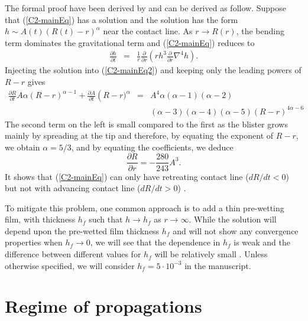 The formal proof  have been derived by  \citet{Flitton:1999iv} and can
be derived  as follow. Suppose  that (\ref{C2-mainEq}) has  a solution
and the solution has the  form $h \sim A(t)(R(t)-r)^{\alpha}$ near the
contact line.  As $r \rightarrow R(r)$, the bending term dominates the
gravitational term and (\ref{C2-mainEq}) reduces to
\begin{eqnarray}
  \frac{\partial       h}{\partial       t}&      =&\frac{1}{       r}
                                                     \frac{\partial}{\partial r}\left( rh^3 \frac{\partial}{\partial r}\nabla^4h\right).
                                                     \label{C2-mainEq2}
\end{eqnarray}
Injecting the  solution into  (\ref{C2-mainEq2}) and keeping  only the
leading powers of $R-r$ gives
\begin{eqnarray}
  \frac{\partial    R}{\partial    t}    A\alpha\left(R-r\right)^{\alpha-1}+
  \frac{\partial           A}{\partial           t}\left(R-r)^{\alpha}
  &=&A^4\alpha(\alpha-1)(\alpha-2)\nonumber\\
  &&(\alpha-3)(\alpha-4)(\alpha-5)(R-r)^{4\alpha-6}\nonumber
\end{eqnarray}
The second  term on  the left is  small compared to  the first  as the
blister  grows  mainly by  spreading  at  the  tip and  therefore,  by
equating  the exponent  of $R-r$,  we obtain  $\alpha =  5/3$, and  by
equating the coefficients, we deduce
\begin{equation}
  \frac{\partial R}{\partial r} =-\frac{280}{243} A^3.
\end{equation}
It shows that (\ref{C2-mainEq}) can  only have retreating contact line
($dR/dt<0$)   but  not   with  advancing   contact  line   ($dR/dt>0$)
\citep{Lister:2013ia,Flitton:1999iv}.

To  mitigate this  problem,  one  common approach  is  to  add a  thin
pre-wetting film, with thickness $h_f$ such that $h\rightarrow h_f$ as
$r\rightarrow  \infty$.   While  the  solution will  depend  upon  the
pre-wetted  film thickness  $h_f$ and  will not  show any  convergence
properties when $h_f\rightarrow 0$, we will see that the dependence in
$h_f$ is  weak and the  difference between different values  for $h_f$
will  be  relatively  small  \citep{Lister:2013ia,Anonymous:QWXp_4JV}.
Unless otherwise specified, we will consider $h_f = 5\cdot 10^{-3}$ in
the manuscript.



\section{Regime of propagations}
\label{C2-sec:regime-propagations}

